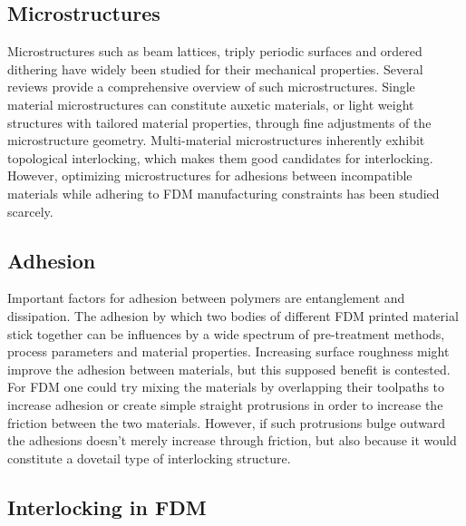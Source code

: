 \subsection{Microstructures}
Microstructures such as beam lattices, triply periodic surfaces and ordered dithering have widely been studied for their mechanical properties.
Several reviews provide a comprehensive overview of such microstructures.\cite{Cadman2013,Zhang2018a,tamburrino2018}
Single material microstructures can constitute auxetic materials, or light weight structures with tailored material properties, through fine adjustments of the microstructure geometry.
Multi-material microstructures inherently exhibit topological interlocking, which makes them good candidates for interlocking\cite{freund2019determination}.
However, optimizing microstructures for adhesions between incompatible materials while adhering to FDM manufacturing constraints has been studied scarcely.



\subsection{Adhesion}

Important factors for adhesion between polymers are entanglement and dissipation\cite{abbott2015adhesion}.
The adhesion by which two bodies of different FDM printed material stick together can be influences by a wide spectrum of pre-treatment methods, process parameters and material properties\cite{freund2019determination}.
Increasing surface roughness might improve the adhesion between materials\cite{huttenbach1991interface,gent1990model}, but this supposed benefit is contested\cite{abbott2015adhesion}.
For FDM one could try mixing the materials by overlapping their toolpaths to increase adhesion or create simple straight protrusions in order to increase the friction between the two materials\cite{tamburrino19}.
However, if such protrusions bulge outward the adhesions doesn't merely increase through friction, but also because it would constitute a dovetail type of interlocking structure.



\subsection{Interlocking in FDM}

